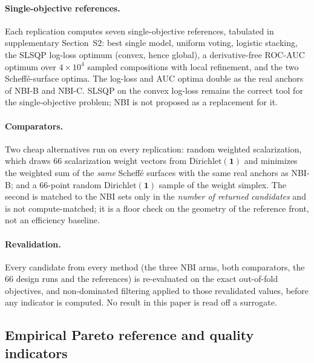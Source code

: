 \paragraph{Single-objective references.} Each replication computes seven single-objective references, tabulated in
supplementary Section~S2: best single model, uniform voting, logistic stacking, the SLSQP log-loss optimum (convex,
hence global), a derivative-free ROC-AUC optimum over $4\times10^{4}$ sampled compositions with local refinement, and
the two Scheff\'e-surface optima. The log-loss and AUC optima double as the real anchors of NBI-B
and NBI-C. SLSQP on the convex log-loss remains the correct tool for the single-objective problem; NBI is not
proposed as a replacement for it.

\paragraph{Comparators.} Two cheap alternatives run on every replication: random weighted scalarization, which
draws 66 scalarization weight vectors from $\mathrm{Dirichlet}(\mathbf{1})$ and minimizes the weighted sum of the
\emph{same} Scheff\'e surfaces with the same real anchors as NBI-B; and a 66-point random
$\mathrm{Dirichlet}(\mathbf{1})$ sample of the weight simplex. The second is matched to the NBI sets only in the
\emph{number of returned candidates} and is not compute-matched; it is a floor check on the geometry of the reference
front, not an efficiency baseline.

\paragraph{Revalidation.} Every candidate from every method (the three NBI arms, both comparators, the 66 design
runs and the references) is re-evaluated on the exact out-of-fold objectives, and non-dominated filtering applied
to those revalidated values, before any indicator is computed. No result in this paper is read off a surrogate.

\subsection{Empirical Pareto reference and quality indicators}
\label{sec:method:reference}

